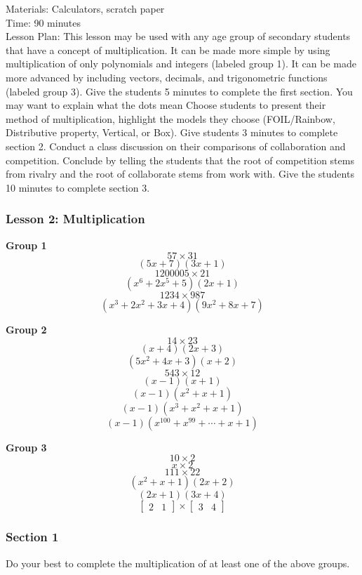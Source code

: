\documentclass[12pt]{article}
\newcommand{\lsol}{\vspace{10em}}
\begin{document}
\begin{appendices}
Materials: Calculators, scratch paper\\

Time: 90 minutes\\

Lesson Plan:  This lesson may be used with any age group of secondary students that have a concept of multiplication.  It can be made more simple by using multiplication of only polynomials and integers (labeled group 1).  It can be made more advanced by including vectors, decimals, and trigonometric functions (labeled group 3).  Give the students 5 minutes to complete the first section.  You may want to explain what the dots mean  Choose students to present their method of multiplication, highlight the models they choose (FOIL/Rainbow, Distributive property, Vertical, or Box).  Give students 3 minutes to complete section 2.  Conduct a class discussion on their comparisons of collaboration and competition.  Conclude by telling the students that the root of competition stems from rivalry and the root of collaborate stems from work with.  Give the students 10 minutes to complete section 3.  

\pagebreak
\subsubsection*{Lesson 2: Multiplication}

\begin{multicols}{3}
\textbf{Group 1}
$$57 \times 31$$
$$(5x+7)(3x+1)$$
$$1200005 \times 21$$
$$(x^6+2x^5+5)(2x+1)$$
$$1234 \times 987$$
$$(x^3+2x^2+3x+4)(9x^2+8x+7)$$

\columnbreak

\textbf{Group 2}
$$14 \times 23$$
$$(x+4)(2x+3)$$
$$(5x^2+4x+3)(x+2)$$
$$543 \times 12$$
$$(x-1)(x+1)$$
$$(x-1)(x^2+x+1)$$
$$(x-1)(x^3+x^2+x+1)$$
$$(x-1)(x^{100}+ x^{99}+ \cdots +x+1)$$
\columnbreak



\columnbreak
\textbf{Group 3}
$$10 \times 2$$
$$x \times 2$$
$$111 \times 22$$
$$(x^2+x+1)(2x+2)$$
$$(2x+1)(3x+4)$$
$$\begin{bmatrix}
2 & 1
\end{bmatrix}
\times
\begin{bmatrix}
3 & 4
\end{bmatrix}$$
\end{multicols}

\subsubsection*{Section 1}
\begin{question}
Do your best to complete the multiplication of at least one of the above groups.
\end{question}\lsol


\end{appendices}
\end{document}

